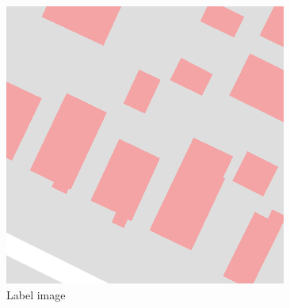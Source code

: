 \documentclass[journal，a4paper]{IEEEtran}
\begin{document}
	\begin{figure}[!hbt]
	\vspace{-1cm}
		\begin{center}
		\includegraphics[width=\columnwidth]{LAB01-00000}
		\caption{Label image}
		\label{fig:label}
		\end{center}
	\end{figure}	


%
%
%
%
%
%

\end{document}
